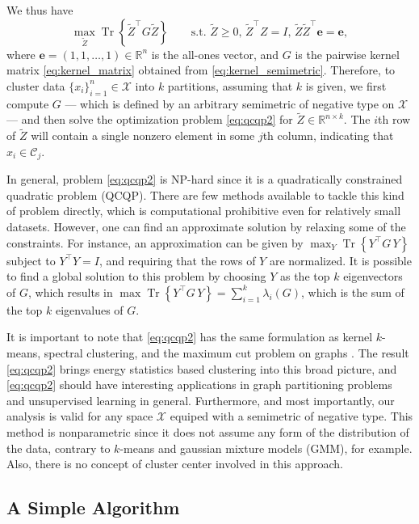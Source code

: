 \documentclass{article}
\DeclareMathOperator{\Tr}{Tr}
\newcommand\C{{\mathcal{C}}}
\newcommand\Zt{\widetilde{Z}}
\begin{document}
We thus have
\begin{equation}
\label{eq:qcqp2}
\max_{\Zt} \Tr \left\{ \Zt^\top G \Zt \right\}  \qquad
\mbox{s.t. $\Zt \ge 0$, $\Zt^\top Z = I$, 
$\Zt \Zt^\top \bm{e} = \bm{e}$},
\end{equation}
where $\bm{e} = (1,1,\dots,1) \in \mathbb{R}^n$ is the all-ones vector,
and $G$ is the pairwise kernel matrix \eqref{eq:kernel_matrix} obtained
from \eqref{eq:kernel_semimetric}.
Therefore, to cluster data $\{ x_i \}_{i=1}^n \in \mathcal{X}$ into 
$k$ partitions,
assuming that $k$ is given, we first compute $G$  --- 
which is  defined by an arbitrary semimetric of negative 
type on $\mathcal{X}$  --- and then 
solve the optimization problem \eqref{eq:qcqp2} for $\Zt \in
\mathbb{R}^{n\times k}$. The $i$th row
of $\Zt$ will contain a single nonzero element in some $j$th column,
indicating that $x_i \in \C_j$.

In general, 
problem \eqref{eq:qcqp2} is NP-hard since it is a quadratically
constrained quadratic problem (QCQP). There are  
few methods available to tackle this kind of problem directly,
which is computational prohibitive even for relatively small datasets.
However, one can find an approximate solution by relaxing some 
of the constraints. For instance, an approximation can be given
by 
$\max_{Y} \Tr\left\{ Y^\top G \, Y \right\}$ subject to $Y^\top Y = I$,
and requiring that the rows of $Y$ are normalized. 
It is possible to find a global solution to this problem by
choosing $Y$ as the top $k$ eigenvectors of $G$, which results
in 
$\max \Tr \left\{ Y^\top G \, Y \right\}  = \sum_{i=1}^k \lambda_i(G)$, 
which is the
sum of the top $k$ eigenvalues of $G$.

It is important to note that \eqref{eq:qcqp2} has the same
formulation as kernel $k$-means, spectral clustering, and the maximum
cut problem on graphs \cite{Dhillon}. The 
result \eqref{eq:qcqp2} brings energy statistics based clustering
into this broad picture, and \eqref{eq:qcqp2} should have 
interesting applications in
graph partitioning problems and unsupervised learning in general. 
Furthermore, and most importantly, our analysis is valid
for any space $\mathcal{X}$ equiped with a semimetric of negative type.
This method is
nonparametric since it does not assume any form of the 
distribution of the data,
contrary to $k$-means and gaussian mixture models (GMM), for example.
Also, there is no concept of cluster center involved in this approach.


\subsection{A Simple Algorithm}
\end{document}
